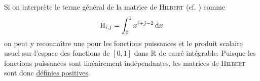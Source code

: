Si on interprète le terme général de la matrice de \textsc{Hilbert} (cf. ) comme 
$$\mathrm{H}_{i,j} = \int_{0}^{1} x^{i+j-2} \, \mathrm{d} x$$
on peut y reconnaître une  pour les fonctions puissances et le produit scalaire usuel sur l'espace des fonctions de $[0, 1]$ dans $\mathbb{R}$ de carré intégrable. Puisque les fonctions puissances sont linéairement indépendantes, les matrices de \textsc{Hilbert} sont donc
\href{https://fr.wikipedia.org/wiki/Matrice_de_Hilbert}{définies positives}.
